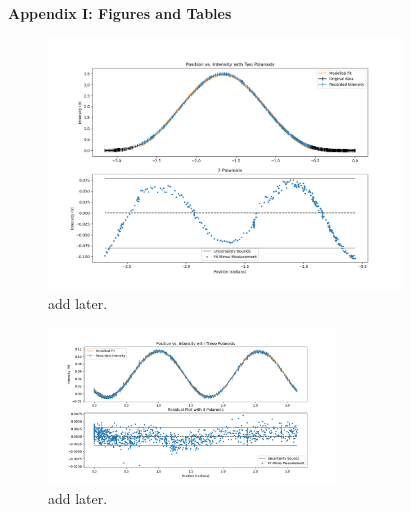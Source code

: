 \documentclass[11pt]{article}
\begin{document}
    \pagebreak 



     \selectfont \textbf{Appendix I: Figures and Tables}
    
     \selectfont

\begin{multicols}{2}
    \begin{figure}[H]
        \hspace{-25pt} 
        \includegraphics[width=3.7in]{malus_2.png}
        \caption{add later.}
        \label{fig:malus_2}
    \end{figure}

\vspace{-20pt}

    \begin{figure}[H]
        \hspace{-5pt}
        \includegraphics[width=3in]{malus_3.png}
        \caption{add later.}
        \label{fig:malus_3}
    \end{figure}




\end{multicols}
\end{document}
